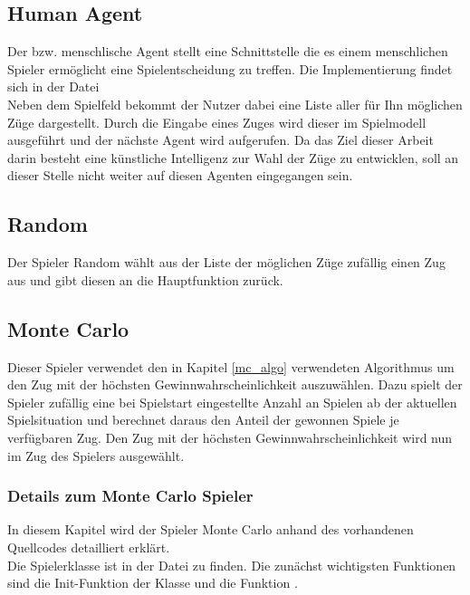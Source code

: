 \subsection{Human Agent}
Der  bzw. menschlische Agent stellt eine Schnittstelle die es einem menschlichen Spieler ermöglicht eine Spielentscheidung zu treffen. Die Implementierung findet sich in der Datei 
\\Neben dem Spielfeld bekommt der Nutzer dabei eine Liste aller für Ihn möglichen Züge dargestellt. Durch die Eingabe eines Zuges wird dieser im Spielmodell ausgeführt und der nächste Agent wird aufgerufen. Da das Ziel dieser Arbeit darin besteht eine künstliche Intelligenz zur Wahl der Züge zu entwicklen, soll an dieser Stelle nicht weiter auf diesen Agenten eingegangen sein.

\subsection{Random}
Der Spieler Random wählt aus der Liste der möglichen Züge zufällig einen Zug aus und gibt diesen an die Hauptfunktion zurück.

\subsection{Monte Carlo}
Dieser Spieler verwendet den in Kapitel \ref{mc_algo} verwendeten Algorithmus um den Zug mit der höchsten Gewinnwahrscheinlichkeit auszuwählen. Dazu spielt der Spieler zufällig eine bei Spielstart eingestellte Anzahl an Spielen ab der aktuellen Spielsituation und berechnet daraus den Anteil der gewonnen Spiele je verfügbaren Zug. Den Zug mit der höchsten Gewinnwahrscheinlichkeit wird nun im  Zug des Spielers ausgewählt.
\subsubsection{Details zum Monte Carlo Spieler}
In diesem Kapitel wird der Spieler Monte Carlo anhand des vorhandenen Quellcodes detailliert erklärt.
\\Die Spielerklasse  ist in der Datei  zu finden.
Die zunächst wichtigsten Funktionen sind die Init-Funktion der Klasse und die Funktion .
